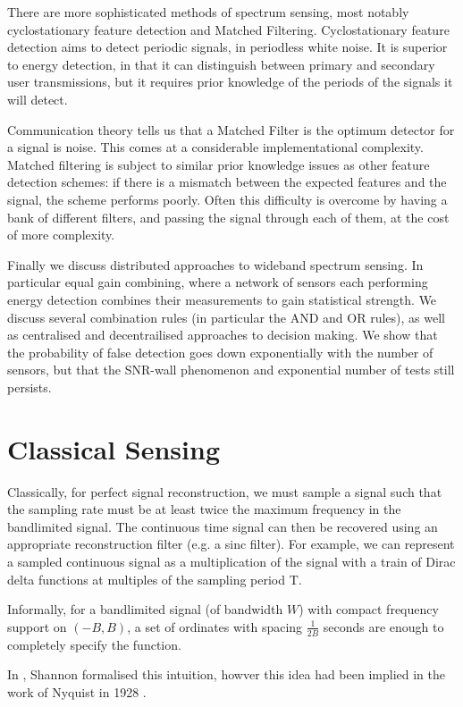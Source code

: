 There are more sophisticated methods of spectrum sensing, most notably cyclostationary feature detection and Matched Filtering. Cyclostationary feature detection aims to detect periodic signals, in periodless white noise. It is superior to energy detection, in that it can distinguish between primary and secondary user transmissions, but it requires prior knowledge of the periods of the signals it will detect. 

Communication theory tells us that a Matched Filter is the optimum detector for a signal is noise. This comes at a considerable implementational complexity. Matched filtering is subject to similar prior knowledge issues as other feature detection schemes: if there is a mismatch between the expected features and the signal, the scheme performs poorly. Often this difficulty is overcome by having a bank of different filters, and passing the signal through each of them, at the cost of more complexity.

Finally we discuss distributed approaches to wideband spectrum sensing. In particular equal gain combining, where a network of sensors each performing energy detection combines their measurements to gain statistical strength. We discuss several combination rules (in particular the AND and OR rules), as well as centralised and decentrailised approaches to decision making. We show that the probability of false detection goes down exponentially with the number of sensors, but that the SNR-wall phenomenon and exponential number of tests still persists.

\section{Classical Sensing}\label{sec:classic-sensing}
Classically, for perfect signal reconstruction, we must sample a signal such that the sampling rate must be at least twice the maximum frequency in the bandlimited signal. The continuous time signal can then be recovered using an appropriate reconstruction filter (e.g. a sinc filter). For example, we can represent a sampled continuous signal as a multiplication of the signal with a train of Dirac delta functions at multiples of the sampling period T.

Informally, for a bandlimited signal (of bandwidth \(W\)) with compact frequency support on \((-B, B)\), a set of ordinates with spacing \(\frac{1}{2B}\) seconds are enough to completely specify the function.

In \cite{shannon2001mathematical}, Shannon formalised this intuition, howver this idea had been implied in the work of Nyquist in 1928 \cite{nyquist2002certain}. 

